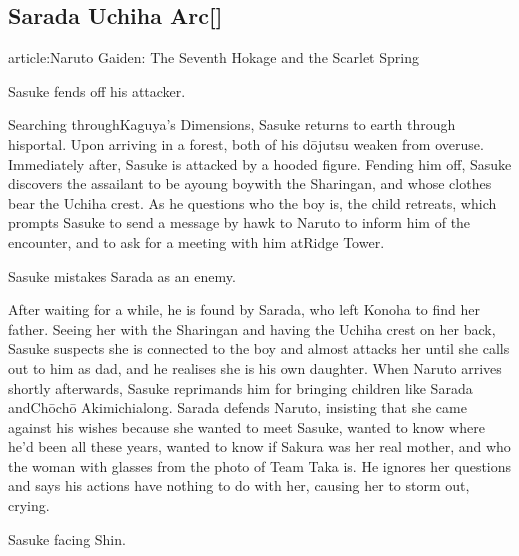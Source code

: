 \documentclass[a4paper,12pt]{article}
\begin{document}
\subsection*{Sarada Uchiha Arc[]}\n\nMain article:Naruto Gaiden: The Seventh Hokage and the Scarlet Spring\\ \par \vspace{0.5cm}

Sasuke fends off his attacker.\\ \par \vspace{0.5cm}

Searching throughKaguya's Dimensions, Sasuke returns to earth through hisportal. Upon arriving in a forest, both of his dōjutsu weaken from overuse. Immediately after, Sasuke is attacked by a hooded figure. Fending him off, Sasuke discovers the assailant to be ayoung boywith the Sharingan, and whose clothes bear the Uchiha crest. As he questions who the boy is, the child retreats, which prompts Sasuke to send a message by hawk to Naruto to inform him of the encounter, and to ask for a meeting with him atRidge Tower.\\ \par \vspace{0.5cm}

Sasuke mistakes Sarada as an enemy.\\ \par \vspace{0.5cm}

After waiting for a while, he is found by Sarada, who left Konoha to find her father. Seeing her with the Sharingan and having the Uchiha crest on her back, Sasuke suspects she is connected to the boy and almost attacks her until she calls out to him as dad, and he realises she is his own daughter. When Naruto arrives shortly afterwards, Sasuke reprimands him for bringing children like Sarada andChōchō Akimichialong. Sarada defends Naruto, insisting that she came against his wishes because she wanted to meet Sasuke, wanted to know where he'd been all these years, wanted to know if Sakura was her real mother, and who the woman with glasses from the photo of Team Taka is. He ignores her questions and says his actions have nothing to do with her, causing her to storm out, crying.\\ \par \vspace{0.5cm}

Sasuke facing Shin.\\ \par \vspace{0.5cm}
\end{document}
